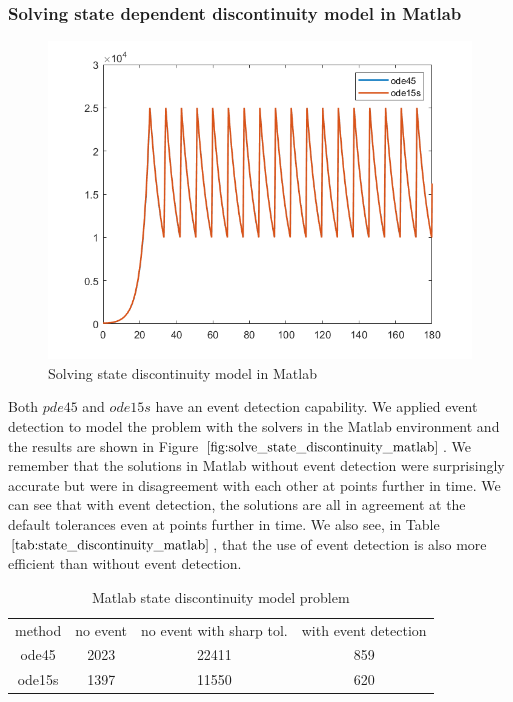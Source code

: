 \subsubsection{Solving state dependent discontinuity model in Matlab}
\begin{figure}[h]
\centering
\includegraphics[width=0.7\linewidth]{./figures/solve_state_discontinuity_matlab}
\caption{Solving state discontinuity model in Matlab}
\label{fig:solve_state_discontinuity_matlab}
\end{figure}
Both $pde45$ and $ode15s$ have an event detection capability. We applied event detection to model the problem with the solvers in the Matlab environment and the results are shown in Figure $\ref{fig:solve_state_discontinuity_matlab}$. We remember that the solutions in Matlab without event detection were surprisingly accurate but were in disagreement with each other at points further in time. We can see that with event detection, the solutions are all in agreement at the default tolerances even at points further in time. We also see, in Table $\ref{tab:state_discontinuity_matlab}$, that the use of event detection is also more efficient than without event detection.

\begin{table}[h]
\caption {Matlab state discontinuity model problem} \label{tab:state_discontinuity_matlab}
\begin{center}
\begin{tabular}{ c c c c } 
method & no event & no event with sharp tol. & with event detection \\ 
ode45 & 2023 & 22411 & 859 \\
ode15s & 1397 & 11550 & 620 \\
\end{tabular}
\end{center}
\end{table}

